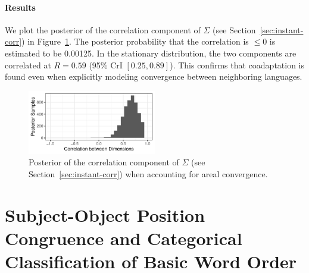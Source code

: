 \documentclass[11pt,a4paper]{article}
\begin{document}
\paragraph{Results}
We plot the posterior of the correlation component of $\Sigma$ (see Section~\ref{sec:instant-corr}) in Figure~\ref{fig:posterior-area-time}.
The posterior probability that the correlation is $\leq 0$ is estimated to be 0.00125.
In the stationary distribution, the two components are correlated at $R = 0.59$ (95\% CrI $[0.25, 0.89]$).
This confirms that coadaptation is found even when explicitly modeling convergence between neighboring languages.


\begin{figure}
	\begin{center}
    \includegraphics[width=0.5\textwidth]{../change/ornuhl-binom-geo-time/fits/corr_sigma.pdf}
	\end{center}
	\caption{Posterior of the correlation component of $\Sigma$ (see Section~\ref{sec:instant-corr}) when accounting for areal convergence.}\label{fig:posterior-area-time}
\end{figure}








\section{Subject-Object Position Congruence and Categorical Classification of Basic Word Order}
\end{document}
